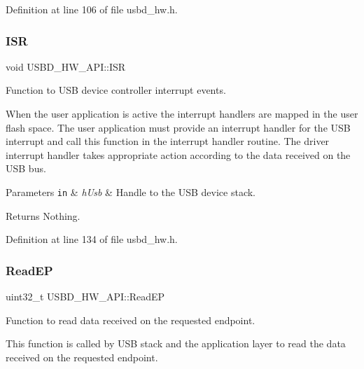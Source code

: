 Definition at line 106 of file usbd\+\_\+hw.\+h.

\mbox{\label{struct_u_s_b_d___h_w___a_p_i_a692e7cd9ee17c66281daad517ab5636d}} 
\subsubsection{\texorpdfstring{I\+SR}{ISR}}
{\footnotesize\ttfamily void U\+S\+B\+D\+\_\+\+H\+W\+\_\+\+A\+P\+I\+::\+I\+SR}

Function to U\+SB device controller interrupt events.

When the user application is active the interrupt handlers are mapped in the user flash space. The user application must provide an interrupt handler for the U\+SB interrupt and call this function in the interrupt handler routine. The driver interrupt handler takes appropriate action according to the data received on the U\+SB bus.


\begin{DoxyParams}[1]{Parameters}
\mbox{\tt in}  & {\em h\+Usb} & Handle to the U\+SB device stack. \\
\hline
\end{DoxyParams}
\begin{DoxyReturn}{Returns}
Nothing. 
\end{DoxyReturn}


Definition at line 134 of file usbd\+\_\+hw.\+h.

\mbox{\label{struct_u_s_b_d___h_w___a_p_i_a637042da839963e43c354ea184582080}} 
\subsubsection{\texorpdfstring{Read\+EP}{ReadEP}}
{\footnotesize\ttfamily uint32\+\_\+t U\+S\+B\+D\+\_\+\+H\+W\+\_\+\+A\+P\+I\+::\+Read\+EP}

Function to read data received on the requested endpoint.

This function is called by U\+SB stack and the application layer to read the data received on the requested endpoint.


